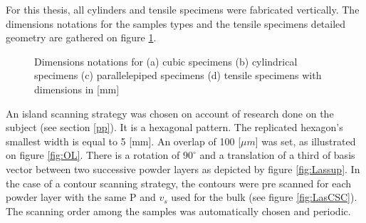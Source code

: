 For this thesis, all cylinders and tensile specimens were fabricated vertically. The dimensions notations for the samples types and the tensile specimens detailed geometry are gathered on figure \ref{fig:cc}.\\

\begin{figure}[ht]
\centering
\noindent{}
\decoRule
\caption[Dimensions notations for (a) cubic specimens (b) cylindrical specimens (c) parallelepiped specimens (d) tensile specimen]{Dimensions notations for (a) cubic specimens (b) cylindrical specimens (c) parallelepiped specimens (d) tensile specimens with dimensions in [mm]}
\label{fig:cc}
\end{figure}


An island scanning strategy was chosen on account of research done on the subject (see section \ref{pp}). It is a hexagonal pattern. The replicated hexagon's smallest width is equal to 5 [mm]. An overlap of 100 [$\mu m$] was set, as illustrated on figure \ref{fig:OL}. There is a rotation of $90^\circ$ and a translation of a third of basis vector between two successive powder layers as depicted by figure \ref{fig:Lassup}. In the case of a contour scanning strategy, the contours were pre scanned for each powder layer with the same P and $v_s$ used for the bulk (see figure \ref{fig:LasCSC}). The scanning order among the samples was automatically chosen and periodic. \\

